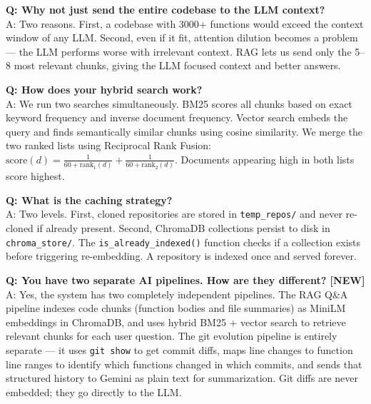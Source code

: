 \documentclass[a4paper,11pt]{article}
\begin{document}
\vspace{8pt}
\textbf{Q: Why not just send the entire codebase to the LLM context?}\\[3pt]
A: Two reasons. First, a codebase with 3000+ functions would exceed the context window of any LLM. Second, even if it fit, attention dilution becomes a problem --- the LLM performs worse with irrelevant context. RAG lets us send only the 5--8 most relevant chunks, giving the LLM focused context and better answers.

\vspace{8pt}
\textbf{Q: How does your hybrid search work?}\\[3pt]
A: We run two searches simultaneously. BM25 scores all chunks based on exact keyword frequency and inverse document frequency. Vector search embeds the query and finds semantically similar chunks using cosine similarity. We merge the two ranked lists using Reciprocal Rank Fusion: $\text{score}(d) = \frac{1}{60 + \text{rank}_1(d)} + \frac{1}{60 + \text{rank}_2(d)}$. Documents appearing high in both lists score highest.

\vspace{8pt}
\textbf{Q: What is the caching strategy?}\\[3pt]
A: Two levels. First, cloned repositories are stored in \texttt{temp\_repos/} and never re-cloned if already present. Second, ChromaDB collections persist to disk in \texttt{chroma\_store/}. The \texttt{is\_already\_indexed()} function checks if a collection exists before triggering re-embedding. A repository is indexed once and served forever.

\vspace{8pt}
\textbf{Q: You have two separate AI pipelines. How are they different? \textbf{[NEW]}}\\[3pt]
A: Yes, the system has two completely independent pipelines. The RAG Q\&A pipeline indexes code chunks (function bodies and file summaries) as MiniLM embeddings in ChromaDB, and uses hybrid BM25 + vector search to retrieve relevant chunks for each user question. The git evolution pipeline is entirely separate --- it uses \texttt{git show} to get commit diffs, maps line changes to function line ranges to identify which functions changed in which commits, and sends that structured history to Gemini as plain text for summarization. Git diffs are never embedded; they go directly to the LLM.
\end{document}
